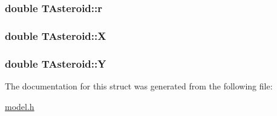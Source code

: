 \subsubsection[{\texorpdfstring{r}{r}}]{\setlength{\rightskip}{0pt plus 5cm}double T\+Asteroid\+::r}\hypertarget{struct_t_asteroid_a357dfe7bec4bc3a95610ff961d1a2c39}{}\label{struct_t_asteroid_a357dfe7bec4bc3a95610ff961d1a2c39}
\subsubsection[{\texorpdfstring{X}{X}}]{\setlength{\rightskip}{0pt plus 5cm}double T\+Asteroid\+::X}\hypertarget{struct_t_asteroid_a38dc61b36ba6e04e2c66b29fe37fcf50}{}\label{struct_t_asteroid_a38dc61b36ba6e04e2c66b29fe37fcf50}
\subsubsection[{\texorpdfstring{Y}{Y}}]{\setlength{\rightskip}{0pt plus 5cm}double T\+Asteroid\+::Y}\hypertarget{struct_t_asteroid_ade59ba9e0d33e907e4a501b0054ebead}{}\label{struct_t_asteroid_ade59ba9e0d33e907e4a501b0054ebead}


The documentation for this struct was generated from the following file\+:\begin{DoxyCompactItemize}
\item 
\hyperlink{model_8h}{model.\+h}\end{DoxyCompactItemize}
